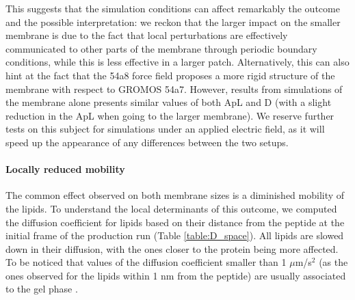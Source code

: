 This suggests that the simulation conditions can affect remarkably the outcome and the possible interpretation: we reckon that the larger impact on the smaller membrane is due to the fact that local perturbations are effectively communicated to other parts of the membrane through periodic boundary conditions, while this is less effective in a larger patch.
%
Alternatively, this can also hint at the fact that the 54a8 force field proposes a more rigid structure of the membrane with respect to GROMOS 54a7. However, results from simulations of the membrane alone presents similar values of both ApL and D (with a slight reduction in the ApL when going to the larger membrane).
%
We reserve further tests on this subject for simulations under an applied electric field, as it will speed up the appearance of any differences between the two setups.


\paragraph{Locally reduced mobility} The common effect observed on both membrane sizes is a diminished mobility of the lipids.
%
To understand the local determinants of this outcome, we computed the diffusion coefficient for lipids based on their distance from the peptide at the initial frame of the production run (Table \ref{table:D_space}).
%
All lipids are slowed down in their diffusion, with the ones closer to the protein being more affected. To be noticed that values of the diffusion coefficient smaller than 1 $\mu$m/s$^2$ (as the ones observed for the lipids within 1 nm from the peptide) are usually associated to the gel phase \cite{Scomparin2009}.

